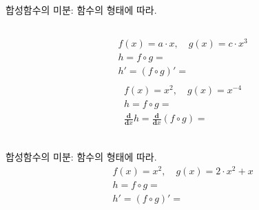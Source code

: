 \documentclass[aspectratio=169]{beamer}
\begin{document}
\begin{frame}{합성함수의 미분: 함수의 형태에 따라.}
  \begin{columns}
    \begin{column}{.5\textwidth}
      \begin{align*}
        & f(x) = a \cdot x , \quad g(x) = c \cdot x^3 \\
        & h = {f} \circ {g} = \\ 
        & h' =  ( {f} \circ {g} )' = \\
      \end{align*}
      \begin{align*}
        & f(x) = x^2 , \quad g(x) = x^{-4} \\
        & h = {f} \circ {g} = \\ 
        & \frac{\mathbf{d}}{\mathbf{d}x} h = \frac{\mathbf{d}}{\mathbf{d}x}( {f} \circ {g} ) = \\
      \end{align*} 
    \end{column}
  \end{columns}  
\end{frame}


\begin{frame}{합성함수의 미분: 함수의 형태에 따라.}
      \begin{align*}
        & f(x) = x^2 , \quad g(x) = 2 \cdot x^2 + x \\
        & h = {f} \circ {g} = \\ 
        & h' = ( {f} \circ {g} )' = \\
      \end{align*}
\end{frame}
\end{document}
